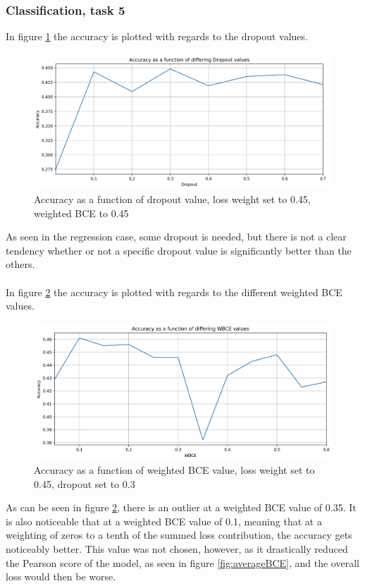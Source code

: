\subsubsection{Classification, task 5}
In figure \ref{fig:dropoutacc} the accuracy is plotted with regards to the dropout values.
\begin{figure}[H]
    \centering
        \includegraphics[width=\textwidth]{pictures/DropoutPlotAcc.png}
        \caption{Accuracy as a function of dropout value, loss weight set to 0.45, weighted BCE to 0.45}
        \label{fig:dropoutacc}
\end{figure}
As seen in the regression case, some dropout is needed, but there is not a clear tendency whether or not a specific dropout value is significantly better than the others.\\
\\
In figure \ref{fig:bceacc} the accuracy is plotted with regards to the different weighted BCE values.
\begin{figure}[H]
    \centering
        \includegraphics[width=\textwidth]{pictures/WBCEPlotAcc.png}
        \caption{Accuracy as a function of weighted BCE value, loss weight set to 0.45, dropout set to 0.3}
        \label{fig:bceacc}
\end{figure}
As can be seen in figure \ref{fig:bceacc}, there is an outlier at a weighted BCE value of 0.35. It is also noticeable that at a weighted BCE value of 0.1, meaning that at a weighting of zeros to a tenth of the summed loss contribution, the accuracy gets noticeably better. This value was not chosen, however, as it drastically reduced the Pearson score of the model, as seen in figure \ref{fig:averageBCE}, and the overall loss would then be worse. \\
